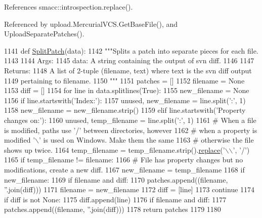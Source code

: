 References smacc\+::introspection.\+replace().



Referenced by upload.\+Mercurial\+V\+C\+S.\+Get\+Base\+File(), and Upload\+Separate\+Patches().


\begin{DoxyCode}
1141 \textcolor{keyword}{def }\hyperlink{namespaceupload_a9dd260785ca4cc97e245234811ef1949}{SplitPatch}(data):
1142   \textcolor{stringliteral}{"""Splits a patch into separate pieces for each file.}
1143 \textcolor{stringliteral}{}
1144 \textcolor{stringliteral}{  Args:}
1145 \textcolor{stringliteral}{    data: A string containing the output of svn diff.}
1146 \textcolor{stringliteral}{}
1147 \textcolor{stringliteral}{  Returns:}
1148 \textcolor{stringliteral}{    A list of 2-tuple (filename, text) where text is the svn diff output}
1149 \textcolor{stringliteral}{      pertaining to filename.}
1150 \textcolor{stringliteral}{  """}
1151   patches = []
1152   filename = \textcolor{keywordtype}{None}
1153   diff = []
1154   \textcolor{keywordflow}{for} line \textcolor{keywordflow}{in} data.splitlines(\textcolor{keyword}{True}):
1155     new\_filename = \textcolor{keywordtype}{None}
1156     \textcolor{keywordflow}{if} line.startswith(\textcolor{stringliteral}{'Index:'}):
1157       unused, new\_filename = line.split(\textcolor{stringliteral}{':'}, 1)
1158       new\_filename = new\_filename.strip()
1159     \textcolor{keywordflow}{elif} line.startswith(\textcolor{stringliteral}{'Property changes on:'}):
1160       unused, temp\_filename = line.split(\textcolor{stringliteral}{':'}, 1)
1161       \textcolor{comment}{# When a file is modified, paths use '/' between directories, however}
1162       \textcolor{comment}{# when a property is modified '\(\backslash\)' is used on Windows.  Make them the same}
1163       \textcolor{comment}{# otherwise the file shows up twice.}
1164       temp\_filename = temp\_filename.strip().\hyperlink{namespacesmacc_1_1introspection_a48571b9bf3b115d2a83cc0147c96d0bd}{replace}(\textcolor{stringliteral}{'\(\backslash\)\(\backslash\)'}, \textcolor{stringliteral}{'/'})
1165       \textcolor{keywordflow}{if} temp\_filename != filename:
1166         \textcolor{comment}{# File has property changes but no modifications, create a new diff.}
1167         new\_filename = temp\_filename
1168     \textcolor{keywordflow}{if} new\_filename:
1169       \textcolor{keywordflow}{if} filename \textcolor{keywordflow}{and} diff:
1170         patches.append((filename, \textcolor{stringliteral}{''}.join(diff)))
1171       filename = new\_filename
1172       diff = [line]
1173       \textcolor{keywordflow}{continue}
1174     \textcolor{keywordflow}{if} diff \textcolor{keywordflow}{is} \textcolor{keywordflow}{not} \textcolor{keywordtype}{None}:
1175       diff.append(line)
1176   \textcolor{keywordflow}{if} filename \textcolor{keywordflow}{and} diff:
1177     patches.append((filename, \textcolor{stringliteral}{''}.join(diff)))
1178   \textcolor{keywordflow}{return} patches
1179 
1180 
\end{DoxyCode}
